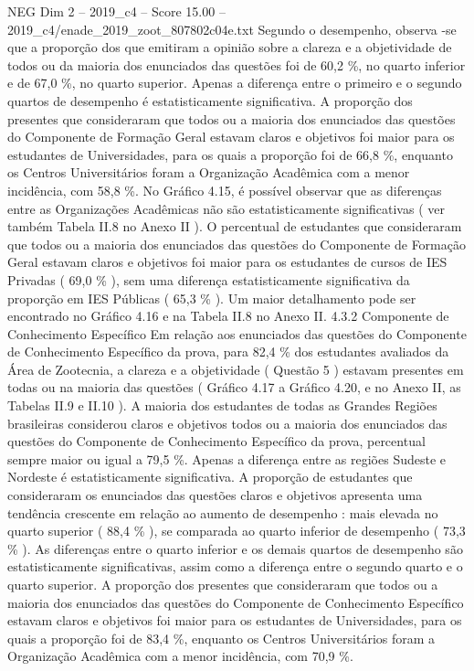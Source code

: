 \begin{textsample}{NEG Dim 2 – 2019\_c4 – Score 15.00 – 2019\_c4/enade\_2019\_zoot\_807802c04e.txt}
Segundo o desempenho, observa -se que a proporção dos que emitiram a opinião sobre a clareza e a objetividade de todos ou da maioria dos enunciados das questões foi de 60,2 \%, no quarto inferior e de 67,0 \%, no quarto superior.
Apenas a diferença entre o primeiro e o segundo quartos de desempenho é estatisticamente significativa.
A proporção dos presentes que consideraram que todos ou a maioria dos enunciados das questões do Componente de Formação Geral estavam claros e objetivos foi maior para os estudantes de Universidades, para os quais a proporção foi de 66,8 \%, enquanto os Centros Universitários foram a Organização Acadêmica com a menor incidência, com 58,8 \%.
No Gráfico 4.15, é possível observar que as diferenças entre as Organizações Acadêmicas não são estatisticamente significativas ( ver também Tabela II.8 no Anexo II ).
O percentual de estudantes que consideraram que todos ou a maioria dos enunciados das questões do Componente de Formação Geral estavam claros e objetivos foi maior para os estudantes de cursos de IES Privadas ( 69,0 \% ), sem uma diferença estatisticamente significativa da proporção em IES Públicas ( 65,3 \% ).
Um maior detalhamento pode ser encontrado no Gráfico 4.16 e na Tabela II.8 no Anexo II. 4.3.2 Componente de Conhecimento Específico Em relação aos enunciados das questões do Componente de Conhecimento Específico da prova, para 82,4 \% dos estudantes avaliados da Área de Zootecnia, a clareza e a objetividade ( Questão 5 ) estavam presentes em todas ou na maioria das questões ( Gráfico 4.17 a Gráfico 4.20, e no Anexo II, as Tabelas II.9 e II.10 ).
A maioria dos estudantes de todas as Grandes Regiões brasileiras considerou claros e objetivos todos ou a maioria dos enunciados das questões do Componente de Conhecimento Específico da prova, percentual sempre maior ou igual a 79,5 \%.
Apenas a diferença entre as regiões Sudeste e Nordeste é estatisticamente significativa.
A proporção de estudantes que consideraram os enunciados das questões claros e objetivos apresenta uma tendência crescente em relação ao aumento de desempenho : mais elevada no quarto superior ( 88,4 \% ), se comparada ao quarto inferior de desempenho ( 73,3 \% ).
As diferenças entre o quarto inferior e os demais quartos de desempenho são estatisticamente significativas, assim como a diferença entre o segundo quarto e o quarto superior.
A proporção dos presentes que consideraram que todos ou a maioria dos enunciados das questões do Componente de Conhecimento Específico estavam claros e objetivos foi maior para os estudantes de Universidades, para os quais a proporção foi de 83,4 \%, enquanto os Centros Universitários foram a Organização Acadêmica com a menor incidência, com 70,9 \%.

\end{textsample}
